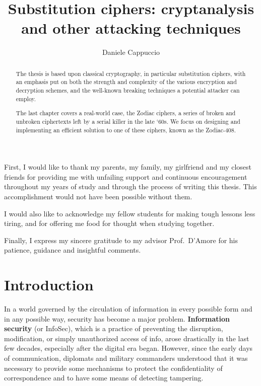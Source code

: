 \documentclass[Lau,binding=0.6cm,oneside]{sapthesis}
\title{Substitution ciphers: cryptanalysis \\and other attacking techniques}
\author{Daniele Cappuccio}
\begin{document}
\frontmatter

\maketitle

\dedication{Dedicated to\\Alan Turing}

\begin{abstract}

The thesis is based upon classical cryptography, in particular substitution ciphers, with an emphasis put on both the strength and complexity of the various encryption and decryption schemes, and the well-known breaking techniques a potential attacker can employ.

The last chapter covers a real-world case, the Zodiac ciphers, a series of broken and unbroken ciphertexts left by a serial killer in the late `60s. We focus on designing and implementing an efficient solution to one of these ciphers, known as the \textsf{Zodiac-408}.

\end{abstract}

\begin{acknowledgments}

First, I would like to thank my parents, my family, my girlfriend and my closest friends for providing me with unfailing support and continuous encouragement throughout my years of study and through the process of writing this thesis. This accomplishment would not have been possible without them.

I would also like to acknowledge my fellow students for making tough lessons less tiring, and for offering me food for thought when studying together.

Finally, I express my sincere gratitude to my advisor Prof.\ D'Amore for his patience, guidance and insightful comments.
\end{acknowledgments}

\tableofcontents

\mainmatter

\chapter{Introduction}
In a world governed by the circulation of information in every possible form and in any possible way, security has become a major problem. \textbf{Information security} (or InfoSec), which is a practice of preventing the disruption, modification, or simply unauthorized access of info, arose drastically in the last few decades, especially after the digital era began. However, since the early days of communication, diplomats and military commanders understood that it was necessary to provide some mechanisms to protect the confidentiality of correspondence and to have some means of detecting tampering.
\end{document}
